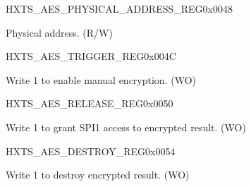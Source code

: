 \begin{register}{H}{XTS\_AES\_PHYSICAL\_ADDRESS\_REG}{0x{}0048}\label{regdesc:XTSAESPHYSICALADDRESSREG}
%
%
\regnewline%
\begin{regdesc}\begin{reglist}
\item [XTS\_AES\_PHYSICAL\_ADDRESS] Physical address. (R/W)
\end{reglist}\end{regdesc}
\end{register}

\begin{register}{H}{XTS\_AES\_TRIGGER\_REG}{0x{}004C}\label{regdesc:XTSAESTRIGGERREG}
%
%
\regnewline%
\begin{regdesc}\begin{reglist}
\item [XTS\_AES\_TRIGGER] Write 1 to enable manual encryption. (WO)
\end{reglist}\end{regdesc}
\end{register}

\begin{register}{H}{XTS\_AES\_RELEASE\_REG}{0x{}0050}\label{regdesc:XTSAESRELEASEREG}
%
%
\regnewline%
\begin{regdesc}\begin{reglist}
\item [XTS\_AES\_RELEASE] Write 1 to grant SPI1 access to encrypted result. (WO)
\end{reglist}\end{regdesc}
\end{register}

\begin{register}{H}{XTS\_AES\_DESTROY\_REG}{0x{}0054}\label{regdesc:XTSAESDESTROYREG}
%
%
\regnewline%
\begin{regdesc}\begin{reglist}
\item [XTS\_AES\_DESTROY] Write 1 to destroy encrypted result. (WO)
\end{reglist}\end{regdesc}
\end{register}


